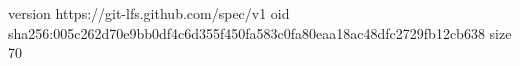 version https://git-lfs.github.com/spec/v1
oid sha256:005c262d70e9bb0df4c6d355f450fa583c0fa80eaa18ac48dfc2729fb12cb638
size 70
